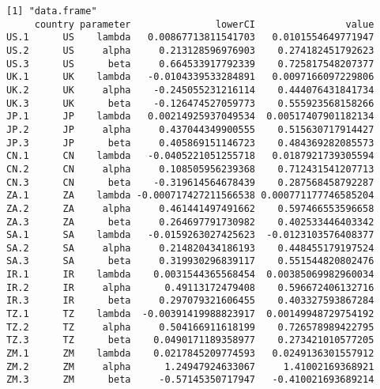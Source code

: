 \documentclass[preprint,authoryear,12pt]{elsarticle}\usepackage{graphicx, color}
\makeatletter
\newenvironment{kframe}{%
 \def\at@end@of@kframe{}%
 \ifinner\ifhmode%
  \def\at@end@of@kframe{\end{minipage}}%
  \begin{minipage}{\columnwidth}%
 \fi\fi%
 \def\FrameCommand##1{\hskip\@totalleftmargin \hskip-\fboxsep
 \colorbox{shadecolor}{##1}\hskip-\fboxsep
     \hskip-\linewidth \hskip-\@totalleftmargin \hskip\columnwidth}%
 \MakeFramed {\advance\hsize-\width
   \@totalleftmargin\z@ \linewidth\hsize
   \@setminipage}}%
 {\par\unskip\endMakeFramed%
 \at@end@of@kframe}
\newenvironment{knitrout}{}{} %
\makeatother
\begin{document}
\begin{knitrout}
\begin{kframe}
{\ttfamily\noindent\itshape\color{messagecolor}{Waiting for profiling to be done...}}

{\ttfamily\noindent\itshape\color{messagecolor}{Waiting for profiling to be done...}}

{\ttfamily\noindent\itshape\color{messagecolor}{Waiting for profiling to be done...}}

{\ttfamily\noindent\itshape\color{messagecolor}{Waiting for profiling to be done...}}

{\ttfamily\noindent\itshape\color{messagecolor}{Waiting for profiling to be done...}}

{\ttfamily\noindent\itshape\color{messagecolor}{Waiting for profiling to be done...}}\begin{verbatim}
[1] "data.frame"
     country parameter               lowerCI                value
US.1      US    lambda   0.00867713811541703   0.0101554649771947
US.2      US     alpha     0.213128596976903    0.274182451792623
US.3      US      beta     0.664533917792339    0.725817548207377
UK.1      UK    lambda   -0.0104339533284891   0.0097166097229806
UK.2      UK     alpha    -0.245055231216114    0.444076431841734
UK.3      UK      beta    -0.126474527059773    0.555923568158266
JP.1      JP    lambda   0.00214925937049534  0.00517407901182134
JP.2      JP     alpha     0.437044349900555    0.515630717914427
JP.3      JP      beta     0.405869151146723    0.484369282085573
CN.1      CN    lambda   -0.0405221051255718   0.0187921739305594
CN.2      CN     alpha     0.108505956239368    0.712431541207713
CN.3      CN      beta    -0.319614564678439    0.287568458792287
ZA.1      ZA    lambda -0.000717427211566538 0.000771177746585204
ZA.2      ZA     alpha     0.461441497491662    0.597466553596658
ZA.3      ZA      beta     0.264697791730982    0.402533446403342
SA.1      SA    lambda   -0.0159263027425623  -0.0123103576408377
SA.2      SA     alpha     0.214820434186193    0.448455179197524
SA.3      SA      beta     0.319930296839117    0.551544820802476
IR.1      IR    lambda    0.0031544365568454  0.00385069982960034
IR.2      IR     alpha      0.49113172479408    0.596672406132716
IR.3      IR      beta     0.297079321606455    0.403327593867284
TZ.1      TZ    lambda  -0.00391419988823917  0.00149948729754192
TZ.2      TZ     alpha     0.504166911618199    0.726578989422795
TZ.3      TZ      beta    0.0490171189358977    0.273421010577205
ZM.1      ZM    lambda    0.0217845209774593   0.0249136301557912
ZM.2      ZM     alpha      1.24947924633067     1.41002169368921
ZM.3      ZM      beta     -0.57145350717947   -0.410021693689214

\end{verbatim}
\end{kframe}
\end{knitrout}
\end{document}
